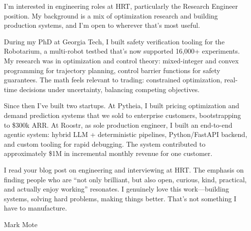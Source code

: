 \documentclass[11pt]{article}
\begin{document}
I'm interested in engineering roles at HRT, particularly the Research Engineer position. My background is a mix of optimization research and building production systems, and I'm open to wherever that's most useful.

During my PhD at Georgia Tech, I built safety verification tooling for the Robotarium, a multi-robot testbed that's now supported 16,000+ experiments. My research was in optimization and control theory: mixed-integer and convex programming for trajectory planning, control barrier functions for safety guarantees. The math feels relevant to trading: constrained optimization, real-time decisions under uncertainty, balancing competing objectives.

Since then I've built two startups. At Pytheia, I built pricing optimization and demand prediction systems that we sold to enterprise customers, bootstrapping to \$300k ARR. At Roostr, as sole production engineer, I built an end-to-end agentic system: hybrid LLM + deterministic pipelines, Python/FastAPI backend, and custom tooling for rapid debugging. The system contributed to approximately \$1M in incremental monthly revenue for one customer.

I read your blog post on engineering and interviewing at HRT. The emphasis on finding people who are ``not only brilliant, but also open, curious, kind, practical, and actually enjoy working'' resonates. I genuinely love this work---building systems, solving hard problems, making things better. That's not something I have to manufacture.

\vspace{1em}
Mark Mote
\end{document}
